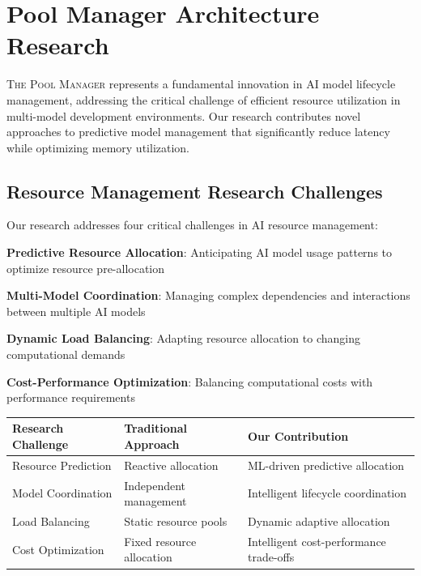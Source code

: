 
\section*{Pool Manager Architecture Research}

\lettrine{T}{he Pool Manager} represents a fundamental innovation in AI model lifecycle management, addressing the critical challenge of efficient resource utilization in multi-model development environments. Our research contributes novel approaches to predictive model management that significantly reduce latency while optimizing memory utilization.

\subsection*{Resource Management Research Challenges}

Our research addresses four critical challenges in AI resource management:

\begin{expandedlist}
    \item \textbf{Predictive Resource Allocation}: Anticipating AI model usage patterns to optimize resource pre-allocation
    \item \textbf{Multi-Model Coordination}: Managing complex dependencies and interactions between multiple AI models
    \item \textbf{Dynamic Load Balancing}: Adapting resource allocation to changing computational demands
    \item \textbf{Cost-Performance Optimization}: Balancing computational costs with performance requirements
\end{expandedlist}

\begin{center}
\begin{tabular}{@{}lll@{}}
\toprule
\textbf{Research Challenge} & \textbf{Traditional Approach} & \textbf{Our Contribution} \\
\midrule
Resource Prediction & Reactive allocation & ML-driven predictive allocation \\
Model Coordination & Independent management & Intelligent lifecycle coordination \\
Load Balancing & Static resource pools & Dynamic adaptive allocation \\
Cost Optimization & Fixed resource allocation & Intelligent cost-performance trade-offs \\
\bottomrule
\end{tabular}
\end{center}

